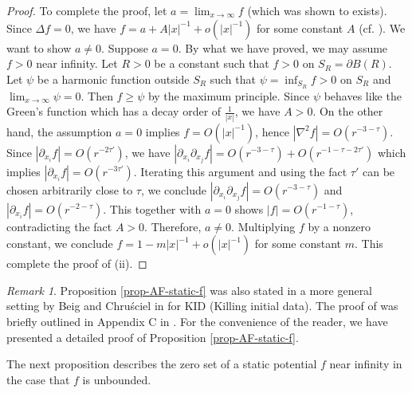 \documentclass[12pt]{amsart}
\theoremstyle{remark}
\newtheorem{remark}{Remark}[section]
\numberwithin{equation}{section}
\def\p{\partial}
\begin{document}
\begin{proof}
To complete the proof,  let $ a =  \lim_{x \rightarrow \infty} f$ (which was shown to exists).
 Since $\Delta f=0$, we have
$  f = a + {A}{|x|^{-1}} + o ( | x |^{-1} ) $
for some constant  $A$ (cf. \cite{Bartnik-1986}). We want to show $ a \neq 0 $.
Suppose $ a = 0 $.
By what we have proved, we may assume $f>0$ near infinity.
 Let $ R > 0 $ be a constant such that  $ f > 0 $ on $ S_R = \p B (R) $.
Let   $ \psi $ be a harmonic function outside $ S_{R}$  such that
 $ \psi = \inf_{S_{R}} f > 0 $ on $ S_R $ and  $ \lim_{x \rightarrow \infty } \psi = 0 .$
Then $ f \ge \psi  $ by the maximum principle.
Since $\psi $ behaves like the Green's function which has a decay order of   $ \frac{1}{|x|}$, we have  $ A > 0 $.
On the other hand, the assumption $ a = 0 $ implies    $ f = O ( {| x |^{-1} })$, hence $|\nabla^2f|=O(r^{-3-\tau})$.
Since $|\p_{x_i}f|=O(r^{-2\tau'})$, we have
$ |\p_{x_i}\p_{x_j}f|=O(r^{-3-\tau})+O(r^{-1-\tau - 2\tau'})$ which implies  $|\p_{x_i}f|=O(r^{-3\tau'})$. Iterating this argument
and using
the fact  $ \tau'$ can be chosen arbitrarily close to $\tau$,
we conclude  $ |\p_{x_i}\p_{x_j}f|=O(r^{-3-\tau})$ and $ | \p_{x_i} f | = O ( r^{-2 - \tau})$.
This together with  $ a = 0 $  shows $|f|=O(r^{-1-\tau})$, contradicting the fact $A>0$.
Therefore,  $a\neq 0$. Multiplying $f$ by a nonzero constant, we conclude
$ f=1-{m}{|x|^{-1}}+o ( |x|^{-1} ) $
for some constant $m$.  This complete the proof of (ii).
\end{proof}

\begin{remark} \label{rmk-prop-3-1}
 Proposition \ref{prop-AF-static-f}  was also stated in a more general setting  
 by  Beig and  Chru\'{s}ciel in \cite[Proposition 2.1] {Beig-Chrusciel-96} for  KID (Killing initial data).  
 The proof of \cite[Proposition 2.1] {Beig-Chrusciel-96} was briefly outlined  in Appendix C in \cite{Beig-Chrusciel-96}.  
 For the convenience of the reader, we have presented a detailed proof of Proposition \ref{prop-AF-static-f}. 
 \end{remark}

The next proposition describes the zero set of  a static potential $f$ near infinity in the case that $f$ is unbounded.
\end{document}
